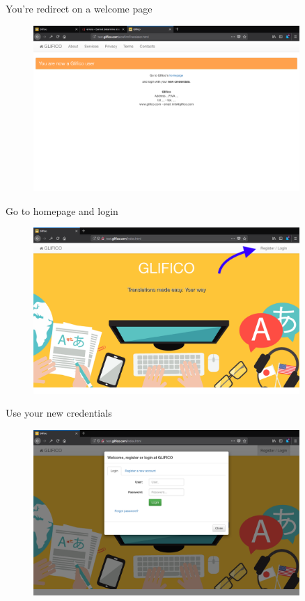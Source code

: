 \documentclass[11 pt, a4paper]{article}
\begin{document}
You're redirect on a welcome page
\begin{figure}[H]
\centering
\includegraphics[width=0.9\textwidth]{translator_register7.png}
\end{figure}

\clearpage
Go to homepage and login
\begin{figure}[H]
\centering
\includegraphics[width=0.9\textwidth]{translator_register0.png}
\end{figure}

Use your new credentials
\begin{figure}[H]
\centering
\includegraphics[width=0.9\textwidth]{login.png}
\end{figure}
\end{document}

